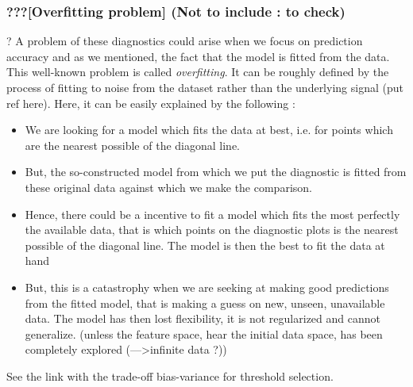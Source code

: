 \subsubsection*{???[Overfitting problem] (Not to include : to check)} \cite{northrop_cross_2016}?
A problem of these diagnostics could arise when we focus on prediction accuracy and as we mentioned, the fact that the model is fitted from the data. This well-known problem is called \emph{overfitting}. It can be roughly defined by the process of fitting to noise from the dataset rather than the underlying signal (put ref here). Here, it can be easily explained by the following :
\begin{itemize}
	
	\item We are looking for a model which fits the data at best, i.e. for points which are the nearest possible of the diagonal line.
	
	\item But, the so-constructed model from which we put the diagnostic is fitted from these original data against which we make the comparison.
	
	\item Hence, there could be a incentive to fit a model which fits the most perfectly the available data, that is which points on the diagnostic plots is the nearest possible of the diagonal line. The model is then the best to fit the data at hand
	
	\item But, this is a catastrophy when we are seeking at making good predictions from the fitted model, that is making a guess on new, unseen, unavailable data. The model has then lost flexibility, it is not regularized and cannot generalize. (unless the feature space, hear the initial data space, has been completely explored (--->infinite data ?))
\end{itemize}
See the link with the trade-off bias-variance for threshold selection.
\fi